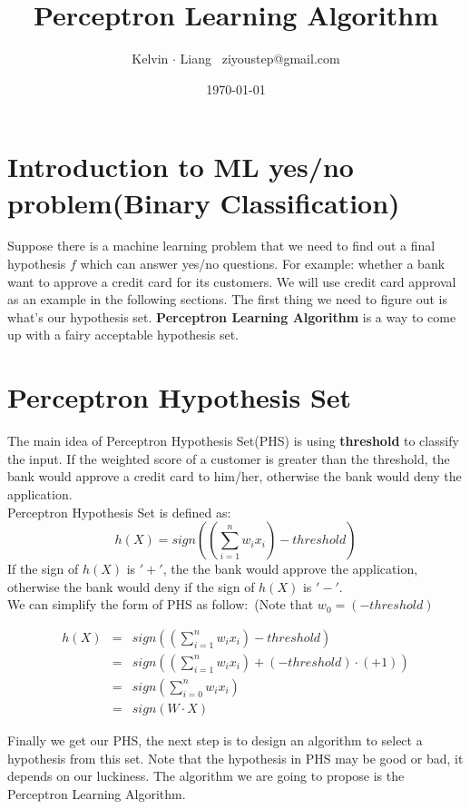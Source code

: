 \documentclass[11pt]{article}
\begin{document}
\title{Perceptron Learning Algorithm}
\author{Kelvin $\cdot$ Liang \, ziyoustep@gmail.com}
\date{\today}
\maketitle

\section{Introduction to ML yes/no problem(Binary Classification)}
Suppose there is a machine learning problem that we need to find out a final hypothesis $f$ which can answer yes/no questions. For example: whether a bank want to approve a credit card for its customers. We will use credit card approval as an example in the following sections.  The first thing we need to figure out is what's our hypothesis set. \textbf{Perceptron Learning Algorithm} is a way to come up with a fairy acceptable hypothesis set.
\section{Perceptron Hypothesis Set}
The main idea of Perceptron Hypothesis Set(PHS) is using \textbf{threshold} to classify the input. If the weighted score of a customer is greater than the threshold, the bank would approve a credit card to him/her, otherwise the bank would deny the application.\\

Perceptron Hypothesis Set is defined as:
$$\displaystyle{h(X) = sign\left(\left(\sum _{i=1}^{n} w_i x_i\right) -threshold \right)}$$
If the sign of $h(X)$ is $'+'$, the the bank would approve the application, otherwise the bank would deny if the sign of $h(X)$ is $'-'$.\\

We can simplify the form of PHS as follow: \,(Note that $w_0=(-threshold)$

\begin{eqnarray*}
h(X) &=& sign\left(\left(\sum _{i=1}^{n} w_i x_i\right) -threshold \right)\\
&=& sign\left(\left(\sum _{i=1}^{n} w_i x_i\right) +(-threshold) \cdot (+1) \right)\\
&=& sign\left(\sum _{i=0}^{n} w_i x_i\right)\\
&=& sign\left( W \cdot X \right)
\end{eqnarray*}

Finally we get our PHS, the next step is to design an algorithm to select a hypothesis from this set. Note that the hypothesis in PHS may be good or bad, it depends on our luckiness. The algorithm we are going to propose is the Perceptron Learning Algorithm.
\end{document}
